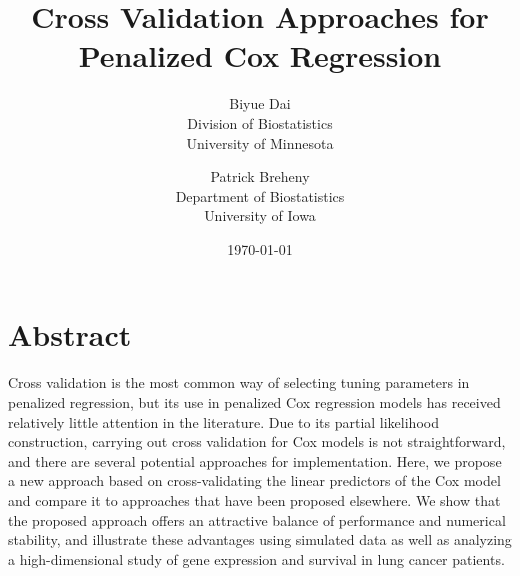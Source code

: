 \documentclass{article}
\title{Cross Validation Approaches for Penalized Cox Regression}
\author{Biyue Dai\\Division of Biostatistics\\University of Minnesota
  \and
  Patrick Breheny\\Department of Biostatistics\\University of Iowa}
\date{\today}
\begin{document}
\maketitle

\section*{Abstract}
Cross validation is the most common way of selecting tuning parameters in penalized regression, but its use in penalized Cox regression models has received relatively little attention in the literature. Due to its partial likelihood construction, carrying out cross validation for Cox models is not straightforward, and there are several potential approaches for implementation. Here, we propose a new approach based on cross-validating the linear predictors of the Cox model and compare it to approaches that have been proposed elsewhere. We show that the proposed approach offers an attractive balance of performance and numerical stability, and illustrate these advantages using simulated data as well as analyzing a high-dimensional study of gene expression and survival in lung cancer patients.




\end{document}
